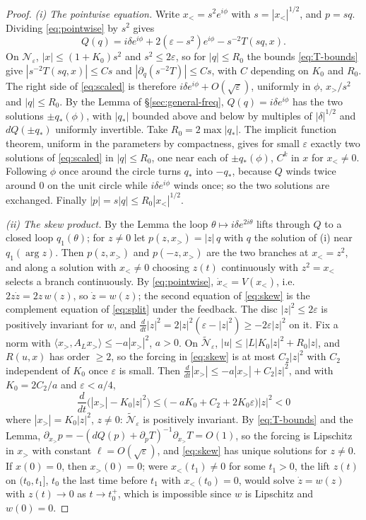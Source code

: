 \documentclass[11pt,reqno]{amsart}
\theoremstyle{plain}
\theoremstyle{definition}
\theoremstyle{remark}
\begin{document}
\begin{proof}
\emph{(i) The pointwise equation.} Write $x_<=s^{2}e^{i\phi}$ with $s=|x_<|^{1/2}$, and $p=sq$.
Dividing \eqref{eq:pointwise} by $s^{2}$ gives
\begin{equation}\label{eq:scaled}
  Q(q)=i\delta e^{i\phi}+2(\varepsilon-s^{2})e^{i\phi}-s^{-2}T(sq,x).
\end{equation}
On $\mathcal N_\varepsilon$, $|x|\le(1+K_0)s^{2}$ and $s^{2}\le2\varepsilon$, so for $|q|\le R_0$ the bounds
\eqref{eq:T-bounds} give $|s^{-2}T(sq,x)|\le Cs$ and $|\partial_q(s^{-2}T)|\le Cs$, with $C$
depending on $K_0$ and $R_0$. The right side of \eqref{eq:scaled} is therefore $i\delta e^{i\phi}+O(\sqrt\varepsilon)$,
uniformly in $\phi$, $x_>/s^{2}$ and $|q|\le R_0$. By the Lemma of \S\ref{sec:general-freq}, $Q(q)=i\delta e^{i\phi}$ has the two
solutions $\pm q_*(\phi)$, with $|q_*|$ bounded above and below by multiples of $|\delta|^{1/2}$
and $dQ(\pm q_*)$ uniformly invertible. Take $R_0=2\max|q_*|$. The implicit function theorem,
uniform in the parameters by compactness, gives for small $\varepsilon$ exactly two solutions of
\eqref{eq:scaled} in $|q|\le R_0$, one near each of $\pm q_*(\phi)$, $C^{k}$ in $x$ for $x_<\neq0$.
Following $\phi$ once around the circle turns $q_*$ into $-q_*$, because $Q$ winds twice around $0$
on the unit circle while $i\delta e^{i\phi}$ winds once; so the two solutions are exchanged. Finally
$|p|=s|q|\le R_0|x_<|^{1/2}$.

\emph{(ii) The skew product.} By the Lemma the loop $\theta\mapsto i\delta e^{2i\theta}$ lifts
through $Q$ to a closed loop $q_1(\theta)$; for $z\neq0$ let $p(z,x_>)=|z|\,q$ with $q$ the solution
of (i) near $q_1(\arg z)$. Then $p(z,x_>)$ and $p(-z,x_>)$ are the two branches at $x_<=z^{2}$,
and along a solution with $x_<\neq0$ choosing $z(t)$ continuously with $z^{2}=x_<$ selects a branch
continuously. By \eqref{eq:pointwise}, $\dot x_<=V(x_<)$, i.e.\ $2z\dot z=2z\,w(z)$, so $\dot z=w(z)$;
the second equation of \eqref{eq:skew} is the complement equation of \eqref{eq:split} under the
feedback. The disc $|z|^{2}\le2\varepsilon$ is positively invariant for $w$, and
$\frac{d}{dt}|z|^{2}=2|z|^{2}(\varepsilon-|z|^{2})\ge-2\varepsilon|z|^{2}$ on it. Fix a norm with
$\langle x_>,A_Lx_>\rangle\le-a|x_>|^{2}$, $a>0$. On $\tilde{\mathcal N}_\varepsilon$,
$|u|\le|L|K_0|z|^{2}+R_0|z|$, and $R(u,x)$ has order $\ge2$, so the forcing in \eqref{eq:skew} is at
most $C_2|z|^{2}$ with $C_2$ independent of $K_0$ once $\varepsilon$ is small. Then
$\frac{d}{dt}|x_>|\le-a|x_>|+C_2|z|^{2}$, and with $K_0=2C_2/a$ and $\varepsilon<a/4$,
\[
  \frac{d}{dt}\bigl(|x_>|-K_0|z|^{2}\bigr)\le\bigl(-aK_0+C_2+2K_0\varepsilon\bigr)|z|^{2}<0
\]
where $|x_>|=K_0|z|^{2}$, $z\neq0$: $\tilde{\mathcal N}_\varepsilon$ is positively invariant. By
\eqref{eq:T-bounds} and the Lemma, $\partial_{x_>}p=-(dQ(p)+\partial_pT)^{-1}\partial_{x_>}T=O(1)$,
so the forcing is Lipschitz in $x_>$ with constant $\ell=O(\sqrt\varepsilon)$, and \eqref{eq:skew} has
unique solutions for $z\neq0$. If $x(0)=0$, then $x_>(0)=0$; were $x_<(t_1)\neq0$ for some $t_1>0$,
the lift $z(t)$ on $(t_0,t_1]$, $t_0$ the last time before $t_1$ with $x_<(t_0)=0$, would solve $\dot z=w(z)$ with
$z(t)\to0$ as $t\to t_0^{+}$, which is impossible since $w$ is Lipschitz and $w(0)=0$.


\end{proof}
\end{document}
